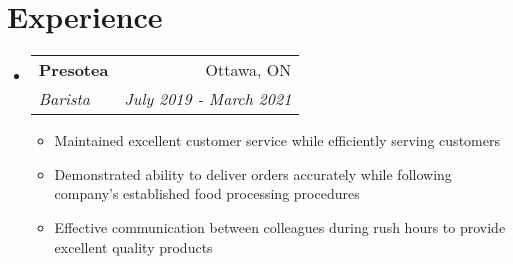 \documentclass[letterpaper,11pt]{article}
\makeatletter
\newcommand{\resumeSubheading}[4]{
  \vspace{-1pt}\item
    \begin{tabular*}{0.97\textwidth}{l@{\extracolsep{\fill}}r}
      \textbf{#1} & #2 \\
      \textit{\small#3} & \textit{\small #4} \\
    \end{tabular*}\vspace{-5pt}
}
\newcommand{\resumeSubHeadingListStart}{\begin{itemize}[leftmargin=*]}
\newcommand{\resumeSubHeadingListEnd}{\end{itemize}}
\newcommand{\resumeItemListStart}{\begin{itemize}}
\newcommand{\resumeItemListEnd}{\end{itemize}\vspace{-5pt}}
\makeatother
\begin{document}
\section{Experience}
  \resumeSubHeadingListStart

    \resumeSubheading
      {Presotea}{Ottawa, ON}
      {Barista}{July 2019 - March 2021}
      \resumeItemListStart
        \item\small{
          Maintained excellent customer service while efficiently serving customers \vspace{-2pt}
        }
        \item\small{
          Demonstrated ability to deliver orders accurately while following company’s established food processing procedures \vspace{-2pt}
        }
        \item\small{
          Effective communication between colleagues during rush hours to provide excellent quality products \vspace{-2pt}
        }
      \resumeItemListEnd

    

  \resumeSubHeadingListEnd

\end{document}
